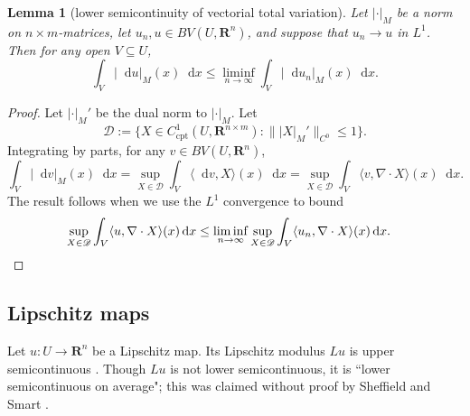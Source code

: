 \documentclass[reqno,11pt]{amsart}
\newcommand{\RR}{\mathbf{R}}
\newcommand*\dif{\mathop{}\!\mathrm{d}}
\newcommand{\cpt}{\mathrm{cpt}}
\newtheorem{lemma}[theorem]{Lemma}
\theoremstyle{definition}
\numberwithin{equation}{section}
\begin{document}
\begin{lemma}[lower semicontinuity of vectorial total variation]\label{TV lower semicontinuity}
Let $|\cdot|_M$ be a norm on $n \times m$-matrices, let $u_n, u \in BV(U, \RR^n)$, and suppose that $u_n \to u$ in $L^1$.
Then for any open $V \subseteq U$,
$$\int_V |\dif u|_M(x) \dif x \leq \liminf_{n \to \infty} \int_V |\dif u_n|_M(x) \dif x.$$
\end{lemma}
\begin{proof}
Let $|\cdot|_M'$ be the dual norm to $|\cdot|_M$.
Let
$$\mathscr D := \{X \in C^1_\cpt(U, \RR^{n \times m}): \||X|_M'\|_{C^0} \leq 1\}.$$
Integrating by parts, for any $v \in BV(U, \RR^n)$, 
$$\int_V |\dif v|_M(x) \dif x = \sup_{X \in \mathscr D} \int_V \langle \dif v, X\rangle(x) \dif x = \sup_{X \in \mathscr D} \int_V \langle v, \nabla \cdot X\rangle(x) \dif x.$$
The result follows when we use the $L^1$ convergence to bound
\begin{align*}
\sup_{X \in \mathscr D} \int_V \langle u, \nabla \cdot X\rangle(x) \dif x 
&\leq \liminf_{n \to \infty} \sup_{X \in \mathscr D} \int_V \langle u_n, \nabla \cdot X\rangle(x) \dif x. \qedhere
\end{align*}
\end{proof}

\subsection{Lipschitz maps}
Let $u: U \to \RR^n$ be a Lipschitz map.
Its Lipschitz modulus $Lu$ is upper semicontinuous \cite[Lemma 4.2(a)]{Crandall2008}.
Though $Lu$ is not lower semicontinuous, it is ``lower semicontinuous on average"; this was claimed without proof by Sheffield and Smart \cite[\S1.4]{Sheffield12}.
\end{document}
